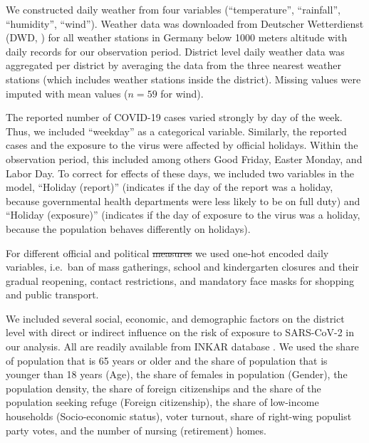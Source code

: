\documentclass[10pt,letterpaper]{article}
\providecommand{\DIFaddtex}[1]{{\protect\color{blue}\uwave{#1}}} %
\providecommand{\DIFdeltex}[1]{{\protect\color{red}\sout{#1}}}                      %
\providecommand{\DIFaddbegin}{} %
\providecommand{\DIFaddend}{} %
\providecommand{\DIFdelbegin}{} %
\providecommand{\DIFdelend}{} %
\providecommand{\DIFadd}[1]{\texorpdfstring{\DIFaddtex{#1}}{#1}} %
\providecommand{\DIFdel}[1]{\texorpdfstring{\DIFdeltex{#1}}{}} %
\newcommand{\DIFscaledelfig}{0.5}
\newlength{\DIFdelgraphicswidth} %
\newlength{\DIFdelgraphicsheight} %
\newcommand{\DIFaddincludegraphics}[2][]{{\color{blue}\fbox{\DIFOincludegraphics[#1]{#2}}}} %
\newcommand{\DIFdelincludegraphics}[2][]{%
\sbox{\DIFdelgraphicsbox}{\DIFOincludegraphics[#1]{#2}}%
\settoboxwidth{\DIFdelgraphicswidth}{\DIFdelgraphicsbox} %
\settoboxtotalheight{\DIFdelgraphicsheight}{\DIFdelgraphicsbox} %
\scalebox{\DIFscaledelfig}{%
\parbox[b]{\DIFdelgraphicswidth}{\usebox{\DIFdelgraphicsbox}\\[-\baselineskip] \rule{\DIFdelgraphicswidth}{0em}}\llap{\resizebox{\DIFdelgraphicswidth}{\DIFdelgraphicsheight}{%
\setlength{\unitlength}{\DIFdelgraphicswidth}%
\begin{picture}(1,1)%
\thicklines\linethickness{2pt} %
{\color[rgb]{1,0,0}\put(0,0){\framebox(1,1){}}}%
{\color[rgb]{1,0,0}\put(0,0){\line( 1,1){1}}}%
{\color[rgb]{1,0,0}\put(0,1){\line(1,-1){1}}}%
\end{picture}%
}\hspace*{3pt}}} %
} %
\DeclareRobustCommand{\DIFaddbegin}{\DIFOaddbegin \let\includegraphics\DIFaddincludegraphics} %
\DeclareRobustCommand{\DIFaddend}{\DIFOaddend \let\includegraphics\DIFOincludegraphics} %
\DeclareRobustCommand{\DIFdelbegin}{\DIFOdelbegin \let\includegraphics\DIFdelincludegraphics} %
\DeclareRobustCommand{\DIFdelend}{\DIFOaddend \let\includegraphics\DIFOincludegraphics} %
\begin{document}
We constructed daily weather from four variables (``temperature'',
``rainfall'', ``humidity'', ``wind''). Weather data was downloaded from
Deutscher Wetterdienst (DWD, \cite{dwd_weather}) for all weather
stations in Germany below 1000 meters altitude with daily records for
our observation period. District level daily weather data was aggregated
per district by averaging the data from the three nearest weather
stations (which includes weather stations inside the district). Missing
values were imputed with mean values (\(n=59\) for wind).

The reported number of COVID-19 cases varied strongly by day of the
week. Thus, we included ``weekday'' as a categorical variable.
Similarly, the reported cases and the exposure to the virus were
affected by official holidays. Within the observation period, this
included among others Good Friday, Easter Monday, and Labor Day. To
correct for effects of these days, we included two variables in the
model, ``Holiday (report)'' (indicates if the day of the report was a
holiday, because governmental health departments were less likely to be
on full duty) and ``Holiday (exposure)'' (indicates if the day of
exposure to the virus was a holiday, because the population behaves
differently on holidays).

For different official and political \DIFdelbegin \DIFdel{measures }\DIFdelend \DIFaddbegin \DIFadd{interventions on a day and district level }\DIFaddend we used one-hot encoded daily variables, i.e.~ban of mass gatherings, school and kindergarten closures and their gradual reopening, contact restrictions, and mandatory face masks for shopping and public transport.

We included several social, economic, and demographic factors on the
district level with direct or indirect influence on the risk of exposure
to SARS-CoV-2 in our analysis. All are readily available from INKAR
database \cite{inkar}. We used the share of population that is 65 years
or older and the share of population that is younger than 18 years
(Age), the share of females in population (Gender), the population
density, the share of foreign citizenships and the share of the
population seeking refuge (Foreign citizenship), the share of low-income
households (Socio-economic status), voter turnout, share of right-wing
populist party votes, and the number of nursing (retirement) homes.
\end{document}
